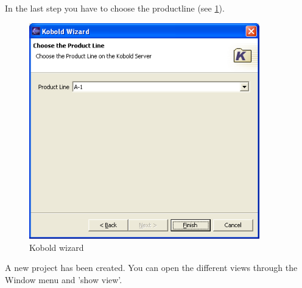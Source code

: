 In the last step you have to choose the productline (see \ref{wizard3}).

\begin{figure}[h!]
\begin{center}
\includegraphics[width=10cm]{wizard3.png}
   \caption{Kobold wizard}
\label{wizard3}
\end{center}
\end{figure}\par

A new project has been created. You can open the different views through the Window menu
and 'show view'. 

